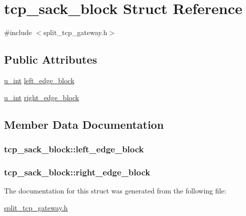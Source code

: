 \hypertarget{structtcp__sack__block}{\section{tcp\-\_\-sack\-\_\-block \-Struct \-Reference}
\label{structtcp__sack__block}
}


{\ttfamily \#include $<$split\-\_\-tcp\-\_\-gateway.\-h$>$}

\subsection*{\-Public \-Attributes}
\begin{DoxyCompactItemize}
\item 
\hyperlink{split__tcp__gateway_8h_ac319c165d52643e43249fe003e18bdf3}{u\-\_\-int} \hyperlink{structtcp__sack__block_aa7f8edc8beafeadf7ed11f8ca7f9edfd}{left\-\_\-edge\-\_\-block}
\item 
\hyperlink{split__tcp__gateway_8h_ac319c165d52643e43249fe003e18bdf3}{u\-\_\-int} \hyperlink{structtcp__sack__block_a4417284e2f5d213938cadbe73aee3da0}{right\-\_\-edge\-\_\-block}
\end{DoxyCompactItemize}


\subsection{\-Member \-Data \-Documentation}
\hypertarget{structtcp__sack__block_aa7f8edc8beafeadf7ed11f8ca7f9edfd}{
\subsubsection[{left\-\_\-edge\-\_\-block}]{ {\bf tcp\-\_\-sack\-\_\-block\-::left\-\_\-edge\-\_\-block}}}\label{structtcp__sack__block_aa7f8edc8beafeadf7ed11f8ca7f9edfd}
\hypertarget{structtcp__sack__block_a4417284e2f5d213938cadbe73aee3da0}{
\subsubsection[{right\-\_\-edge\-\_\-block}]{ {\bf tcp\-\_\-sack\-\_\-block\-::right\-\_\-edge\-\_\-block}}}\label{structtcp__sack__block_a4417284e2f5d213938cadbe73aee3da0}


\-The documentation for this struct was generated from the following file\-:\begin{DoxyCompactItemize}
\item 
\hyperlink{split__tcp__gateway_8h}{split\-\_\-tcp\-\_\-gateway.\-h}\end{DoxyCompactItemize}
